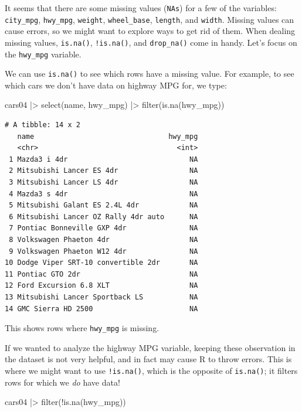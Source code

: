 \documentclass[
  letterpaper,
]{book}
\newenvironment{Shaded}{\begin{snugshade}}{\end{snugshade}}
\newcommand{\FunctionTok}[1]{\textcolor[rgb]{0.28,0.35,0.67}{#1}}
\newcommand{\NormalTok}[1]{\textcolor[rgb]{0.00,0.23,0.31}{#1}}
\newcommand{\SpecialCharTok}[1]{\textcolor[rgb]{0.37,0.37,0.37}{#1}}
\begin{document}
It seems that there are some missing values
(\texttt{NA\textquotesingle{}s}) for a few of the variables:
\texttt{city\_mpg}, \texttt{hwy\_mpg}, \texttt{weight},
\texttt{wheel\_base}, \texttt{length}, and \texttt{width}. Missing
values can cause errors, so we might want to explore ways to get rid of
them. When dealing missing values, \texttt{is.na()}, \texttt{!is.na()},
and \texttt{drop\_na()} come in handy. Let's focus on the
\texttt{hwy\_mpg} variable.

We can use \texttt{is.na()} to see which rows have a missing value. For
example, to see which cars we don't have data on highway MPG for, we
type:

\begin{Shaded}
\begin{Highlighting}[]
\NormalTok{cars04 }\SpecialCharTok{|\textgreater{}} 
  \FunctionTok{select}\NormalTok{(name, hwy\_mpg) }\SpecialCharTok{|\textgreater{}} 
  \FunctionTok{filter}\NormalTok{(}\FunctionTok{is.na}\NormalTok{(hwy\_mpg))}
\end{Highlighting}
\end{Shaded}

\begin{verbatim}
# A tibble: 14 x 2
   name                                hwy_mpg
   <chr>                                 <int>
 1 Mazda3 i 4dr                             NA
 2 Mitsubishi Lancer ES 4dr                 NA
 3 Mitsubishi Lancer LS 4dr                 NA
 4 Mazda3 s 4dr                             NA
 5 Mitsubishi Galant ES 2.4L 4dr            NA
 6 Mitsubishi Lancer OZ Rally 4dr auto      NA
 7 Pontiac Bonneville GXP 4dr               NA
 8 Volkswagen Phaeton 4dr                   NA
 9 Volkswagen Phaeton W12 4dr               NA
10 Dodge Viper SRT-10 convertible 2dr       NA
11 Pontiac GTO 2dr                          NA
12 Ford Excursion 6.8 XLT                   NA
13 Mitsubishi Lancer Sportback LS           NA
14 GMC Sierra HD 2500                       NA
\end{verbatim}

This shows rows where \texttt{hwy\_mpg} is missing.

If we wanted to analyze the highway MPG variable, keeping these
observation in the dataset is not very helpful, and in fact may cause R
to throw errors. This is where we might want to use \texttt{!is.na()},
which is the opposite of \texttt{is.na()}; it filters rows for which we
\emph{do} have data!

\begin{Shaded}
\begin{Highlighting}[]
\NormalTok{cars04 }\SpecialCharTok{|\textgreater{}} 
  \FunctionTok{filter}\NormalTok{(}\SpecialCharTok{!}\FunctionTok{is.na}\NormalTok{(hwy\_mpg))}
\end{Highlighting}
\end{Shaded}
\end{document}
